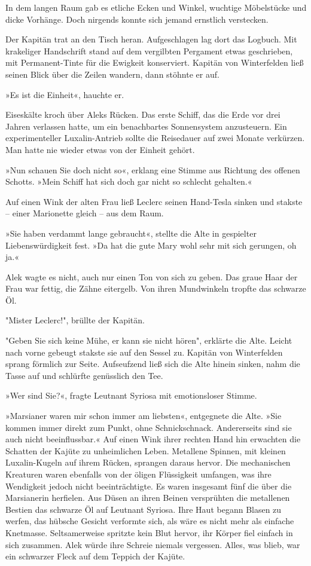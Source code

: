 In dem langen Raum gab es etliche Ecken und Winkel, wuchtige
Möbelstücke und dicke Vorhänge. Doch nirgends konnte sich jemand
ernstlich verstecken.

Der Kapitän trat an den Tisch heran. Aufgeschlagen lag dort das
Logbuch. Mit krakeliger Handschrift stand auf dem vergilbten
Pergament etwas geschrieben, mit Permanent-Tinte für die Ewigkeit
konserviert. Kapitän von Winterfelden ließ seinen Blick über die
Zeilen wandern, dann stöhnte er auf.

»Es ist die Einheit«, hauchte er.

\bigpar

Eiseskälte kroch über Aleks Rücken. Das erste Schiff, das die Erde
vor drei Jahren verlassen hatte, um ein benachbartes Sonnensystem
anzusteuern. Ein experimenteller Luxalin-Antrieb sollte die
Reisedauer auf zwei Monate verkürzen. Man hatte nie wieder etwas
von der Einheit gehört.

»Nun schauen Sie doch nicht so«, erklang eine Stimme aus Richtung
des offenen Schotts. »Mein Schiff hat sich doch gar nicht so
schlecht gehalten.«

\tb

Auf einen Wink der alten Frau ließ Leclerc seinen Hand-Tesla sinken
und stakste – einer Marionette gleich – aus dem Raum.

»Sie haben verdammt lange gebraucht«, stellte die Alte in
gespielter Liebenswürdigkeit fest. »Da hat die gute Mary wohl sehr
mit sich gerungen, oh ja.«

Alek wagte es nicht, auch nur einen Ton von sich zu geben. Das
graue Haar der Frau war fettig, die Zähne eitergelb. Von ihren
Mundwinkeln tropfte das schwarze Öl.

"Mister Leclerc!", brüllte der Kapitän.

"Geben Sie sich keine Mühe, er kann sie nicht hören", erklärte die
Alte. Leicht nach vorne gebeugt stakste sie auf den Sessel zu.
Kapitän von Winterfelden sprang förmlich zur Seite. Aufseufzend
ließ sich die Alte hinein sinken, nahm die Tasse auf und schlürfte
genüsslich den Tee.

»Wer sind Sie?«, fragte Leutnant Syriosa mit emotionsloser Stimme.

»Marsianer waren mir schon immer am liebsten«, entgegnete die Alte.
»Sie kommen immer direkt zum Punkt, ohne Schnickschnack.
Andererseits sind sie auch nicht beeinflussbar.« Auf einen Wink
ihrer rechten Hand hin erwachten die Schatten der Kajüte zu
unheimlichen Leben. Metallene Spinnen, mit kleinen Luxalin-Kugeln
auf ihrem Rücken, sprangen daraus hervor. Die mechanischen
Kreaturen waren ebenfalls von der öligen Flüssigkeit umfangen, was
ihre Wendigkeit jedoch nicht beeinträchtigte. Es waren insgesamt
fünf die über die Marsianerin herfielen. Aus Düsen an ihren Beinen
versprühten die metallenen Bestien das schwarze Öl auf Leutnant
Syriosa. Ihre Haut begann Blasen zu werfen, das hübsche Gesicht
verformte sich, als wäre es nicht mehr als einfache Knetmasse.
Seltsamerweise spritzte kein Blut hervor, ihr Körper fiel einfach
in sich zusammen. Alek würde ihre Schreie niemals vergessen. Alles,
was blieb, war ein schwarzer Fleck auf dem Teppich der Kajüte.


